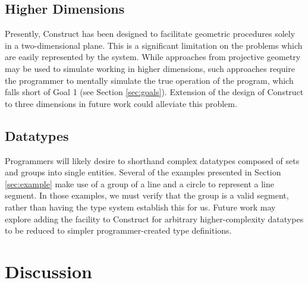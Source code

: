 \documentclass[twoside,11pt]{report}
\begin{document}
\subsection{Higher Dimensions}

Presently, Construct has been designed to facilitate geometric procedures solely in a two-dimensional plane. 
This is a significant limitation on the problems which are easily represented by the system. 
While approaches from projective geometry may be used to simulate working in higher dimensions, such approaches require the programmer to mentally simulate the true operation of the program, which falls short of Goal 1 (see Section \ref{sec:goals}).
Extension of the design of Construct to three dimensions in future work could alleviate this problem.

\subsection{Datatypes}

Programmers will likely desire to shorthand complex datatypes composed of sets and groups into single entities. 
Several of the examples presented in Section \ref{sec:example} make use of a group of a line and a circle to represent a line segment. 
In those examples, we must verify that the group is a valid segment, rather than having the type system establish this for us.
Future work may explore adding the facility to Construct for arbitrary higher-complexity datatypes to be reduced to simpler programmer-created type definitions.

\section{Discussion}

\appendix

\nocite{*}



\end{document}
